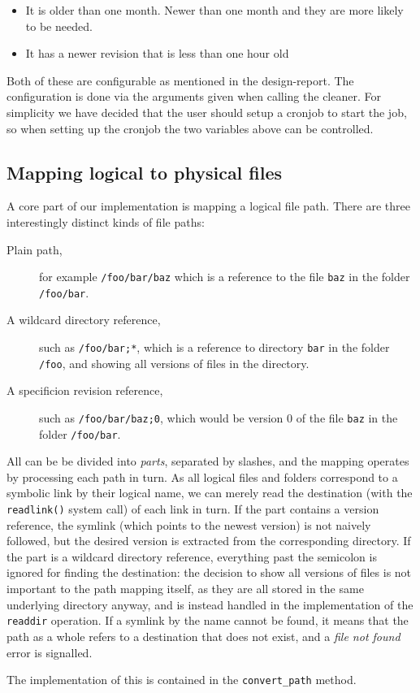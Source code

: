 \documentclass[12pt]{article}
\begin{document}
\begin{itemize}
\item It is older than one month. Newer than one month and they are more likely
to be needed.
\item It has a newer revision that is less than one hour old
\end{itemize}

Both of these are configurable as mentioned in the design-report. The
configuration is done via the arguments given when calling the cleaner. For
simplicity we have decided that the user should setup a cronjob to start the
job, so when setting up the cronjob the two variables above can be controlled.


\subsection{Mapping logical to physical files}

A core part of our implementation is mapping a logical file path.
There are three interestingly distinct kinds of file paths:

\begin{description}
\item[Plain path,] for example \texttt{/foo/bar/baz} which is a
  reference to the file \texttt{baz} in the folder \texttt{/foo/bar}.
\item[A wildcard directory reference,] such as \texttt{/foo/bar;*},
  which is a reference to directory \texttt{bar} in the folder
  \texttt{/foo}, and showing all versions of files in the directory.
\item[A specificion revision reference,] such as
  \texttt{/foo/bar/baz;0}, which would be version $0$ of the file
  \texttt{baz} in the folder \texttt{/foo/bar}.
\end{description}

All can be be divided into \textit{parts}, separated by slashes, and
the mapping operates by processing each path in turn.  As all logical
files and folders correspond to a symbolic link by their logical name,
we can merely read the destination (with the \texttt{readlink()}
system call) of each link in turn.  If the part contains a version
reference, the symlink (which points to the newest version) is not
naively followed, but the desired version is extracted from the
corresponding directory.  If the part is a wildcard directory
reference, everything past the semicolon is ignored for finding the
destination: the decision to show all versions of files is not
important to the path mapping itself, as they are all stored in the
same underlying directory anyway, and is instead handled in the
implementation of the \texttt{readdir} operation. If a symlink by the
name cannot be found, it means that the path as a whole refers to a
destination that does not exist, and a \textit{file not found} error
is signalled.

The implementation of this is contained in the \texttt{convert\_path}
method.
\end{document}
